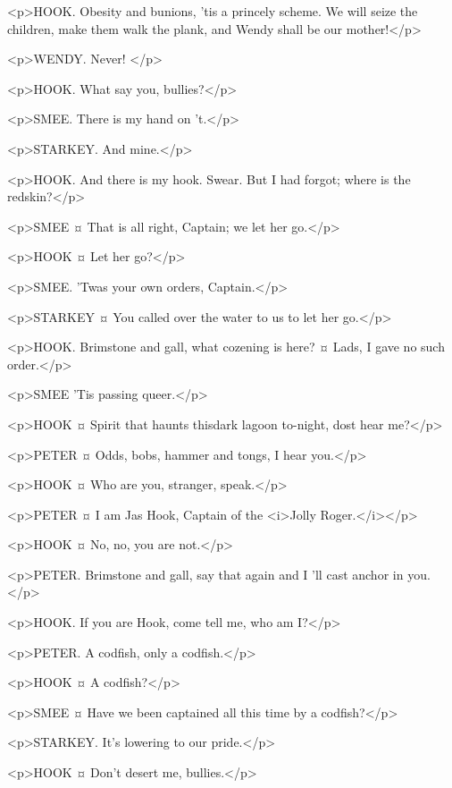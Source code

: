 <p>HOOK. Obesity and bunions, 'tis a princely scheme. We will seize the children, make them walk the plank, and Wendy shall be our mother!</p>

<p>WENDY. Never!
</p>

<p>HOOK. What say you, bullies?</p>

<p>SMEE. There is my hand on 't.</p>

<p>STARKEY. And mine.</p>

<p>HOOK. And there is my hook. Swear.
But I had forgot; where is the redskin?</p>

<p>SMEE ¤
That is all right, Captain; we let her go.</p>

<p>HOOK ¤
Let her go?</p>

<p>SMEE. 'Twas your own orders, Captain.</p>

<p>STARKEY ¤
You called over the water to us to let her go.</p>

<p>HOOK. Brimstone and gall, what cozening is here?
¤
Lads, I gave no such order.</p>

<p>SMEE 'Tis passing queer.</p>

<p>HOOK ¤
Spirit that haunts thisdark lagoon to-night, dost hear me?</p>

<p>PETER ¤
Odds, bobs, hammer and tongs, I hear you.</p>

<p>HOOK ¤
Who are you, stranger, speak.</p>

<p>PETER ¤
I am Jas Hook, Captain of the <i>Jolly Roger.</i></p>

<p>HOOK ¤
No, no, you are not.</p>

<p>PETER. Brimstone and gall, say that again and I 'll cast anchor in you.</p>

<p>HOOK. If you are Hook, come tell me, who am I?</p>

<p>PETER. A codfish, only a codfish.</p>

<p>HOOK ¤
A codfish?</p>

<p>SMEE ¤
Have we been captained all this time by a codfish?</p>

<p>STARKEY. It's lowering to our pride.</p>

<p>HOOK ¤
Don't desert me, bullies.</p>

